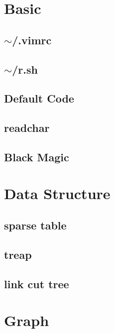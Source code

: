 
\section{Basic}
\subsection{$\sim$/.vimrc}

\subsection{$\sim$/r.sh}

% 
\subsection{Default Code}

\subsection{readchar}

\subsection{Black Magic}


\section{Data Structure}
\subsection{sparse table}

\subsection{treap}

\subsection{link cut tree}


\section{Graph}
